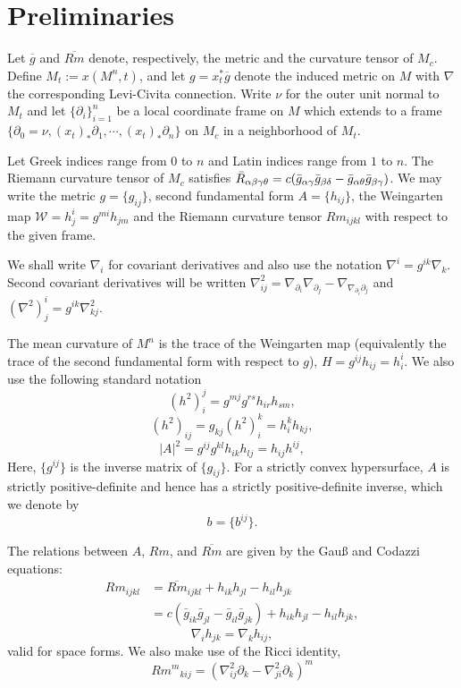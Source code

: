 \documentclass{amsart}
\begin{document}
\section{Preliminaries}

Let $\overline{g}$ and $\overline{Rm}$ denote, respectively, the metric and the curvature tensor of $M_c$. Define \(M_t := x(M^n,t)\), and let \(g = x_t^{\ast} \overline{g}\) denote the induced metric on \(M\) with $\nabla$ the corresponding Levi-Civita connection. Write $\nu$ for the outer unit normal to $M_t$ and let \(\{\partial_i\}_{i=1}^n\) be a local coordinate frame on \(M\) which extends to a frame \(\{\partial_0 = \nu, (x_t)_{\ast} \partial_1, \cdots, (x_t)_{\ast} \partial_n\}\) on \(M_c\) in a neighborhood of \(M_t\).

Let Greek indices range from \(0\) to \(n\) and Latin indices range from \(1\) to \(n\). The Riemann curvature tensor of \(M_c\) satisfies \(\bar{R}_{\alpha\beta\gamma\theta} = c(\bar{g}_{\alpha\gamma}\bar{g}_{\beta\delta} - \bar{g}_{\alpha\theta}\bar{g}_{\beta\gamma})\). We may write the metric $g = \{g_{ij}\}$, second fundamental form $A = \{h_{ij}\}$, the Weingarten map $\mathcal{W} = h^i_j = g^{mi} h_{jm}$ and the Riemann curvature tensor $Rm_{ijkl}$ with respect to the given frame.

We shall write \(\nabla_i\) for covariant derivatives and also use the notation \(\nabla^i = g^{ik} \nabla_k\). Second covariant derivatives will be written \(\nabla^2_{ij} = \nabla_{\partial_i} \nabla_{\partial_j} - \nabla_{\nabla_{\partial_i} \partial_j}\) and \((\nabla^2)^i_j = g^{ik} \nabla^2_{kj}\).

The mean curvature of $M^n$ is the trace of the Weingarten map (equivalently the trace of the second fundamental form with respect to $g$), $H = g^{ij}h_{ij} = h^i_i$. We also use the following standard notation
\[
(h^2)_i^j = g^{mj}g^{rs}h_{ir}h_{sm},
\]
\[
(h^2)_{ij} = g_{kj} (h^2)_i^k = h^k_i h_{kj},
\]
\[
|A|^2 = g^{ij}g^{kl}h_{ik}h_{lj} = h_{ij}h^{ij},
\]
Here, $\{g^{ij}\}$ is the inverse matrix of $\{g_{ij}\}.$ For a strictly convex hypersurface, \(A\) is strictly positive-definite and hence has a strictly positive-definite inverse, which we denote by
\[
b = \{b^{ij}\}.
\]

The relations between $A$, $Rm$, and $\overline{Rm}$ are given by the Gau{\ss} and Codazzi equations:
\[
\begin{split}
Rm_{ijkl} &= \overline{Rm}_{ijkl} + h_{ik}h_{jl} - h_{il}h_{jk} \\
&= c(\bar{g}_{ik}\bar{g}_{jl} - \bar{g}_{il}\bar{g}_{jk}) + h_{ik}h_{jl} - h_{il}h_{jk},
\end{split}
\]
\[
\nabla_i h_{jk} = \nabla_k h_{ij},
\]
valid for space forms. We also make use of the Ricci identity,
\[
{Rm^m}_{kij}  = \left(\nabla^2_{ij} \partial_k - \nabla^2_{ji} \partial_k\right)^m
\]
\end{document}
